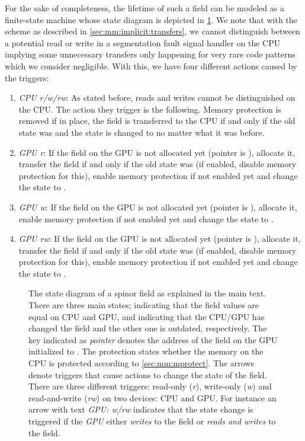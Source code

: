 For the sake of completeness, the lifetime of such a field can be modeled as a finite-state machine whose state diagram is depicted in \cref{fig:mm:fsm}.
We note that with the scheme as described in \cref{sec:mm:implicit:transfers}, we cannot distinguish between a potential read or write in a segmentation fault signal handler on the CPU implying some unnecessary transfers only happening for very rare code patterns which we consider negligible.
With this, we have four different actions caused by the triggers:
\begin{enumerate}
  \item \emph{CPU r/w/rw}: As stated before, reads and writes cannot be distinguished on the CPU. The action they trigger is the following. Memory protection is removed if in place, the field is transferred to the CPU if and only if the old state was  and the state is changed to  no matter what it was before.
  \item \emph{GPU r}: If the field on the GPU is not allocated yet (pointer is ), allocate it, transfer the field if and only if the old state was  (if enabled, disable memory protection for this), enable memory protection if not enabled yet and change the state to .
  \item \emph{GPU w}: If the field on the GPU is not allocated yet (pointer is ), allocate it, enable memory protection if not enabled yet and change the state to .
  \item \emph{GPU rw}: If the field on the GPU is not allocated yet (pointer is ), allocate it, transfer the field if and only if the old state was  (if enabled, disable memory protection for this), enable memory protection if not enabled yet and change the state to .
\end{enumerate}

\begin{figure}
  
  \caption{The state diagram of a spinor field as explained in the main text. There are three main states;  indicating that the field values are equal on CPU and GPU,  and  indicating that the CPU/GPU has changed the field and the other one is outdated, respectively. The key indicated as \emph{pointer} denotes the address of the field on the GPU initialized to . The protection states whether the memory on the CPU is protected according to \cref{sec:mm:mprotect}. The arrows denote triggers that cause actions to change the state of the field. There are three different triggers: read-only (\emph{r}), write-only (\emph{w}) and read-and-write (\emph{rw}) on two devices: CPU and GPU. For instance an arrow with text \emph{GPU: w/rw} indicates that the state change is triggered if the \emph{GPU} either \emph{writes} to the field or \emph{reads and writes} to the field.}
  \label{fig:mm:fsm}
\end{figure}

